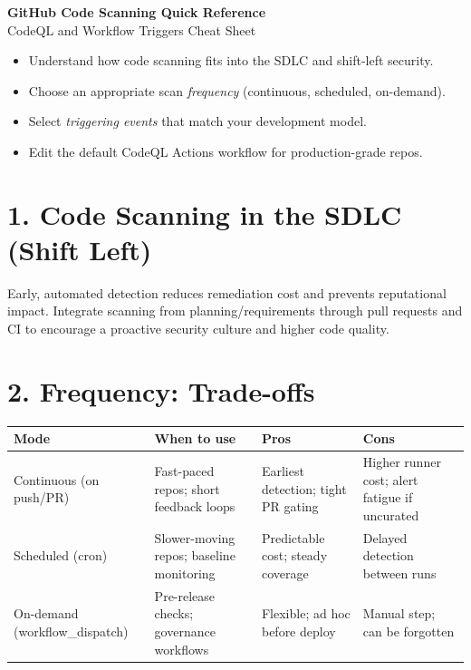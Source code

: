 \documentclass[11pt]{article}
\begin{document}
\begin{center}
  {\LARGE \textbf{GitHub Code Scanning Quick Reference}}\\[2pt]
  {\large CodeQL and Workflow Triggers Cheat Sheet}
\end{center}

\vspace{0.5em}

\begin{tcolorbox}[colframe=RoyalBlue!50!black,title=Learning Objectives]
\begin{itemize}
  \item Understand how code scanning fits into the SDLC and shift-left security.
  \item Choose an appropriate scan \emph{frequency} (continuous, scheduled, on-demand).
  \item Select \emph{triggering events} that match your development model.
  \item Edit the default CodeQL Actions workflow for production-grade repos.
\end{itemize}
\end{tcolorbox}

\section*{1. Code Scanning in the SDLC (Shift Left)}
Early, automated detection reduces remediation cost and prevents reputational impact. Integrate scanning from planning/requirements through pull requests and CI to encourage a proactive security culture and higher code quality.

\section*{2. Frequency: Trade-offs}
\begin{tabularx}{\linewidth}{@{}l X X X@{}}
\toprule
\textbf{Mode} & \textbf{When to use} & \textbf{Pros} & \textbf{Cons} \\
\midrule
Continuous (on push/PR) & Fast-paced repos; short feedback loops & Earliest detection; tight PR gating & Higher runner cost; alert fatigue if uncurated \\
Scheduled (cron) & Slower-moving repos; baseline monitoring & Predictable cost; steady coverage & Delayed detection between runs \\
On-demand (workflow\_dispatch) & Pre-release checks; governance workflows & Flexible; ad hoc before deploy & Manual step; can be forgotten \\
\bottomrule
\end{tabularx}
\end{document}
